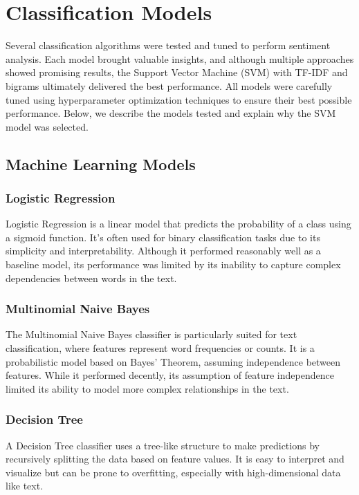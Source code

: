 \documentclass[a4paper,40pt,twocolumn]{article}
\begin{document}
 
\section{Classification Models}

Several classification algorithms were tested and tuned to perform sentiment analysis. Each model brought valuable insights, and although multiple approaches showed promising results, the Support Vector Machine (SVM) with TF-IDF and bigrams ultimately delivered the best performance. All models were carefully tuned using hyperparameter optimization techniques to ensure their best possible performance. Below, we describe the models tested and explain why the SVM model was selected.



\subsection{Machine Learning Models}

\subsubsection{Logistic Regression}
Logistic Regression is a linear model that predicts the probability of a class using a sigmoid function. It's often used for binary classification tasks due to its simplicity and interpretability. Although it performed reasonably well as a baseline model, its performance was limited by its inability to capture complex dependencies between words in the text.

\subsubsection{Multinomial Naive Bayes}
The Multinomial Naive Bayes classifier is particularly suited for text classification, where features represent word frequencies or counts. It is a probabilistic model based on Bayes' Theorem, assuming independence between features. While it performed decently, its assumption of feature independence limited its ability to model more complex relationships in the text.

\subsubsection{Decision Tree}
A Decision Tree classifier uses a tree-like structure to make predictions by recursively splitting the data based on feature values. It is easy to interpret and visualize but can be prone to overfitting, especially with high-dimensional data like text.
\end{document}
